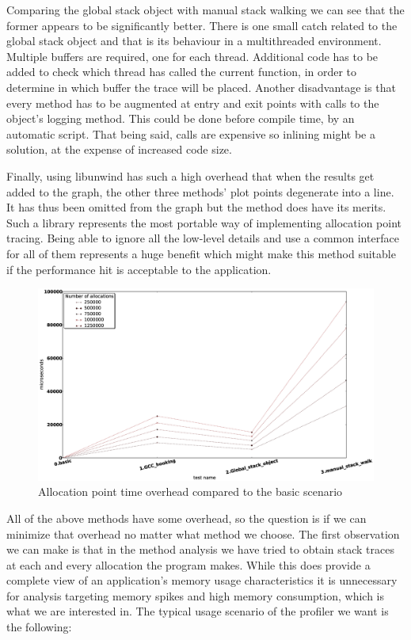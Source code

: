 Comparing the global stack object with manual stack walking we can see that the former appears to be significantly better. There is one small catch related to the global stack object and that is its behaviour in a multithreaded environment. Multiple buffers are required, one for each thread. Additional code has to be added to check which thread has called the current function, in order to determine in which buffer the trace will be placed. Another disadvantage is that every method has to be augmented at entry and exit points with calls to the object's logging method. This could be done before compile time, by an automatic script. That being said, calls are expensive so inlining might be a solution, at the expense of increased code size.

Finally, using libunwind has such a high overhead that when the results get added to the graph, the other three methods' plot points degenerate into a line. It has thus been omitted from the graph but the method does have its merits. Such a library represents the most portable way of implementing allocation point tracing. Being able to ignore all the low-level details and use a common interface for all of them represents a huge benefit which might make this method suitable if the performance hit is acceptable to the application.

\begin{figure}[htb]
\centering
\includegraphics[scale=0.5, width=\textwidth]{src/img/allocationpoint}
\caption{Allocation point time overhead compared to the basic scenario}
\label{fig:allocpoint}
\end{figure}

All of the above methods have some overhead, so the question is if we can minimize that overhead no matter what method we choose. The first observation we can make is that in the method analysis we have tried to obtain stack traces at each and every allocation the program makes. While this does provide a complete view of an application's memory usage characteristics it is unnecessary for analysis targeting memory spikes and high memory consumption, which is what we are interested in. The typical usage scenario of the profiler we want is the following:

